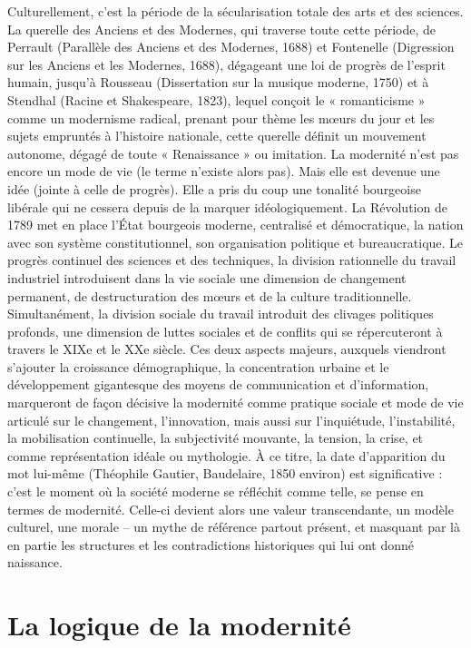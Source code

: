 Culturellement, c'est la période de la sécularisation totale des arts et des sciences. La querelle des Anciens et des Modernes, qui traverse toute cette période, de Perrault (Parallèle des Anciens et des Modernes, 1688) et Fontenelle (Digression sur les Anciens et les Modernes, 1688), dégageant une loi de progrès de l'esprit humain, jusqu'à Rousseau (Dissertation sur la musique
moderne, 1750) et à Stendhal (Racine et Shakespeare, 1823), lequel conçoit le « romanticisme » comme un modernisme radical, prenant pour thème les mœurs du jour et les sujets empruntés à l'histoire nationale, cette querelle définit un mouvement autonome, dégagé de toute « Renaissance » ou imitation. La modernité n'est pas encore un mode de vie (le terme n'existe alors pas). Mais elle est devenue une idée (jointe à celle de progrès). Elle a pris du coup une tonalité bourgeoise libérale qui ne cessera depuis de la marquer idéologiquement.
La Révolution de 1789 met en place l'État bourgeois moderne, centralisé et démocratique, la nation avec son système constitutionnel, son organisation politique et bureaucratique.
Le progrès continuel des sciences et des techniques, la division rationnelle du travail industriel introduisent dans la vie sociale une dimension de changement permanent, de destructuration des mœurs et de la culture traditionnelle. Simultanément, la division sociale du travail introduit des clivages politiques profonds, une dimension de luttes sociales et de conflits qui se répercuteront à travers le XIXe et le XXe siècle.
Ces deux aspects majeurs, auxquels viendront s'ajouter la croissance démographique, la concentration urbaine et le développement gigantesque des moyens de communication et d'information, marqueront de façon décisive la modernité comme pratique sociale et mode de vie articulé sur le changement, l'innovation, mais aussi sur l'inquiétude, l'instabilité, la mobilisation continuelle, la subjectivité mouvante, la tension, la crise, et comme représentation idéale ou mythologie. À ce titre, la date d'apparition du mot lui-même (Théophile Gautier, Baudelaire, 1850 environ) est significative : c'est le moment où la société moderne se réfléchit comme telle, se pense en termes de modernité. Celle-ci devient alors une valeur transcendante, un modèle culturel, une morale – un mythe de référence partout présent, et masquant par là en partie les structures et les contradictions historiques qui lui ont donné naissance.

\section{La logique de la modernité}

